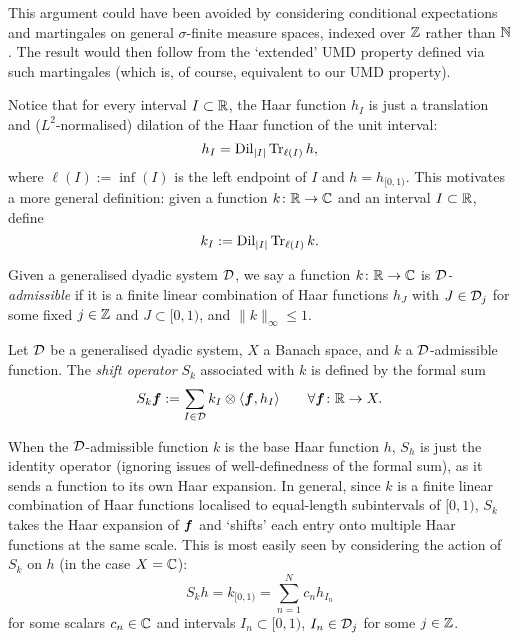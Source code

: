 \begin{rmk}
  This argument could have been avoided by considering conditional expectations and martingales on general $\sigma$-finite measure spaces, indexed over $\mathbb{Z}$ rather than $\mathbb{N}$.
  The result would then follow from the `extended' UMD property defined via such martingales (which is, of course, equivalent to our UMD property).
\end{rmk}


Notice that for every interval $I \subset \mathbb{R}$, the Haar function $h_{I}$ is just a translation and ($L^2$-normalised) dilation of the Haar function of the unit interval:%
\begin{equation*}
  h_{I} = \operatorname{Dil}_{|I|} \operatorname{Tr}_{\ell(I)} h,
\end{equation*}
where $\ell(I) := \inf(I)$ is the left endpoint of $I$ and $h = h_{[0,1)}$.
This motivates a more general definition: given a function $k \colon \mathbb{R} \rightarrow \mathbb{C}$ and an interval $I \subset \mathbb{R}$, define
\begin{equation*}
  k_{I} := \operatorname{Dil}_{|I|} \operatorname{Tr}_{\ell(I)} k.
\end{equation*}

\begin{defn}
  Given a generalised dyadic system $\mathcal{D}$, we say a function $k \colon \mathbb{R} \rightarrow \mathbb{C}$ is \emph{$\mathcal{D}$-admissible} if it is a finite linear combination of Haar functions $h_{J}$ with $J \in \mathcal{D}_{j}$ for some fixed $j \in \mathbb{Z}$ and $J \subset [0,1)$,
  and $\|k\|_{\infty} \leq 1$.
\end{defn}


\begin{defn}
  Let $\mathcal{D}$ be a generalised dyadic system, $X$ a Banach space, and $k$ a $\mathcal{D}$-admissible function.
  The \emph{shift operator} $S_{k}$ associated with $k$ is defined by the formal sum
  \begin{equation*}
    S_{k} \bm{f} := \sum_{I \in \mathcal{D}} k_{I} \otimes \langle \bm{f}, h_{I} \rangle \qquad \forall \bm{f} \colon \mathbb{R} \rightarrow X.
  \end{equation*}
\end{defn}

When the $\mathcal{D}$-admissible function $k$ is the base Haar function $h$, $S_{h}$ is just the identity operator (ignoring issues of well-definedness of the formal sum), as it sends a function to its own Haar expansion.
In general, since $k$ is a finite linear combination of Haar functions localised to equal-length subintervals of $[0,1)$, $S_{k}$ takes the Haar expansion of $\bm{f}$ and `shifts' each entry onto multiple Haar functions at the same scale.
This is most easily seen by considering the action of $S_{k}$ on $h$ (in the case $X = \mathbb{C}$):
\begin{equation*}
  S_{k} h = k_{[0,1)} = \sum_{n=1}^{N} c_{n} h_{I_{n}}
\end{equation*}
for some scalars $c_{n} \in \mathbb{C}$ and intervals $I_{n} \subset [0,1)$, $I_{n} \in \mathcal{D}_{j}$ for some $j \in \mathbb{Z}$.

